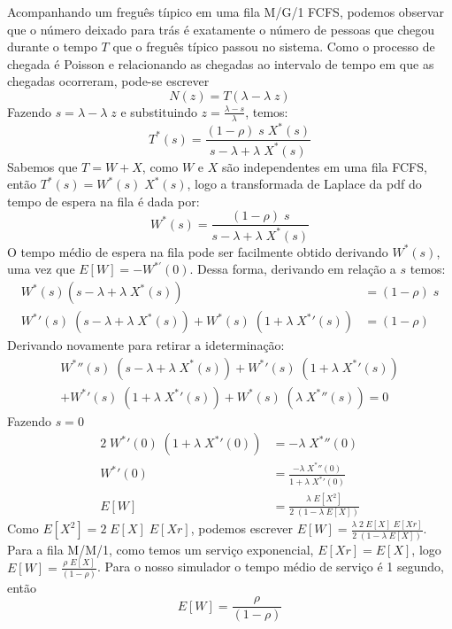 \documentclass[a4paper]{article}
\newcommand{\E}[1]{E\!\left[#1\right]}
\begin{document}
Acompanhando um freguês tíıpico em uma fila M/G/1 FCFS,
podemos observar que o número deixado para trás é
exatamente o número de pessoas que chegou
durante o tempo \(T\) que o freguês típico passou no sistema.
Como o processo de chegada é Poisson
e relacionando as chegadas ao intervalo de tempo em
que as chegadas ocorreram,
pode-se escrever
\[
    N(z) = T(\lambda - \lambda \; z)
\]
Fazendo \(s = \lambda - \lambda \; z\)
e substituindo \(z = \frac{\lambda - s}{\lambda}\),
temos:
\[
    T^*(s) =
    \frac{(1 - \rho)\; s \; X^*(s)}{s - \lambda + \lambda \; X^*(s)}
\]
Sabemos que \(T = W + X\), como \(W\) e \(X\)
são independentes em uma fila FCFS,
então  \(T^*(s) =  W^*(s) \; X^*(s)\),
logo a transformada de Laplace
da pdf do tempo de espera na fila é dada por:
\[
    W^*(s) = \frac{(1 - \rho) \; s}{s - \lambda + \lambda \; X^*(s)}
\]
O tempo médio de espera na fila
pode ser facilmente obtido derivando \(W^{*}(s)\),
uma vez que \(E[W] = - W^{*'}(0)\).
Dessa forma, derivando em relação a \(s\) temos:
\begin{align*}
    W^*(s)(s - \lambda + \lambda \; X^*(s)) &= (1 - \rho) \; s \\
    {W^*}'(s) \; (s - \lambda + \lambda \; X^*(s))
        + W^*(s) \; (1 + \lambda \; {X^*}'(s)) &= (1 - \rho)
\end{align*}
Derivando novamente para retirar a ideterminação:
\begin{align*}
    {W^*}''(s) \; (s - \lambda + \lambda \; X^*(s))
        + {W^*}'(s) \; (1 + \lambda \; {X^*}'(s)) \\
        + {W^*}'(s) \; (1 + \lambda \; {X^*}'(s))
        + W^*(s) \; (\lambda \; {X^*}''(s)) = 0
\end{align*}
Fazendo \(s = 0\)
\begin{align*}
    2 \; {W^*}'(0) \; (1 + \lambda \; {X^*}'(0))
        &= - \lambda \; {X^*}''(0) \\
    {W^*}'(0)
        &= \frac{-\lambda \; {X^*}''(0)}{1 + \lambda \; {X^*}'(0)} \\
    \E{W} &= \frac{\lambda \; \E{X^2}}{2 \; (1 - \lambda \; \E{X})}
\end{align*}
Como \(\E{X^2} = 2 \; \E{X} \; \E{Xr}\),
podemos escrever
\(
    \E{W} = \frac{\lambda \; 2 \; \E{X} \; \E{Xr}}{2
        \; (1 - \lambda \; \E{X})}
\).
Para a fila M/M/1,
como temos um serviço exponencial,
\(E[Xr] = E[X]\),
logo \(\E{W} = \frac{\rho \; \E{X}}{(1 - \rho)}\).
Para o nosso simulador o tempo médio de serviço é 1 segundo,
então
\[
    \E{W} = \frac{\rho}{(1 - \rho)}
\]
\end{document}
